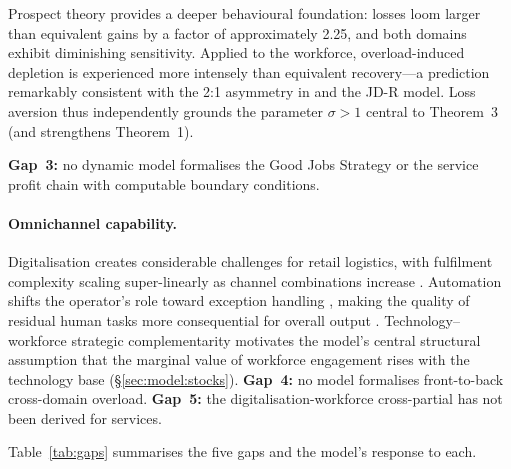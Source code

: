 \documentclass[msom,dblanonrev]{informs4}
\begin{document}
Prospect theory \citep{kahneman1979prospect, tversky1992advances} provides a deeper behavioural foundation: losses loom larger than equivalent gains by a factor of approximately 2.25, and both domains exhibit diminishing sensitivity. Applied to the workforce, overload-induced depletion is experienced more intensely than equivalent recovery---a prediction remarkably consistent with the 2:1 asymmetry in \citet{oliva2001cutting} and the JD-R model. Loss aversion thus independently grounds the parameter $\sigma > 1$ central to Theorem~3 (and strengthens Theorem~1).

\textbf{Gap~3:} no dynamic model formalises the Good Jobs Strategy or the service profit chain with computable boundary conditions.

\paragraph{Omnichannel capability.}\label{sec:lit:omni}
Digitalisation creates considerable challenges for retail logistics, with fulfilment complexity scaling super-linearly as channel combinations increase \citep{hubner2021digitalization, saghiri2017toward, bell2018inventory, acimovic2015fulfillment}. Automation shifts the operator's role toward exception handling \citep{bainbridge1983ironies}, making the quality of residual human tasks more consequential for overall output \citep{gans2026oring}. Technology--workforce strategic complementarity \citep{milgrom1990economics, aral2012three} motivates the model's central structural assumption that the marginal value of workforce engagement rises with the technology base (\S\ref{sec:model:stocks}). \textbf{Gap~4:} no model formalises front-to-back cross-domain overload. \textbf{Gap~5:} the digitalisation-workforce cross-partial has not been derived for services.

\medskip
\noindent Table~\ref{tab:gaps} summarises the five gaps and the model's response to each.
\end{document}

